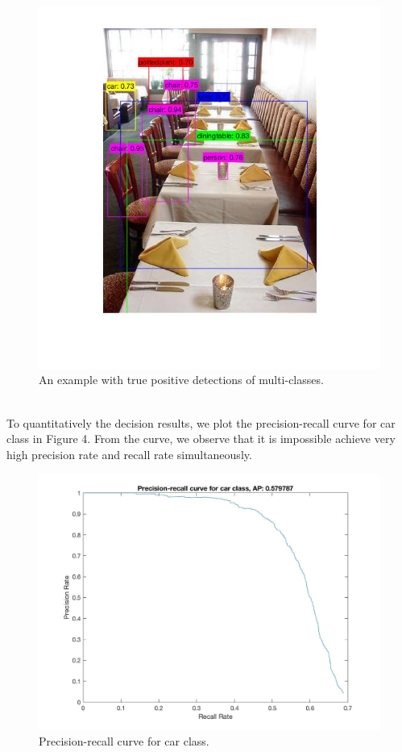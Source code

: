 \documentclass[10pt]{article}
\begin{document}
	\begin{figure}[ht]
		\includegraphics[scale = 0.75]{best_detection.jpg}
		\centering
		\caption{An example with true positive detections of multi-classes.}
		\label{3}
	\end{figure}\\
	\newpage To quantitatively the decision results, we plot the precision-recall curve for car class in Figure 4. From the curve, we observe that it is impossible achieve very high precision rate and recall rate simultaneously.\\
	\begin{figure}[ht]
		\includegraphics[width=\textwidth]{pr_curve_car.jpg}
		\centering
		\caption{Precision-recall curve for car class.}
		\label{4}
	\end{figure}\\
\end{document}
